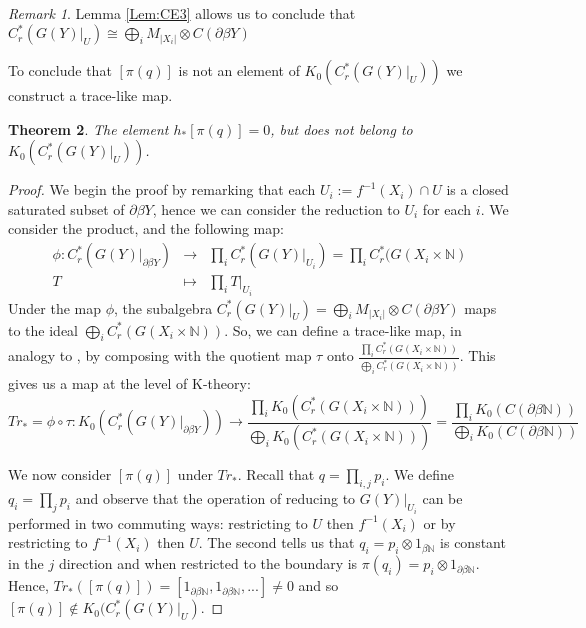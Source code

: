 \documentclass[11pt]{amsart}
\theoremstyle{plain}
\newtheorem{theorem}{Theorem}%
\theoremstyle{definition}%
\theoremstyle{remark}%
\newtheorem{remark}[theorem]{Remark}%
\begin{document}
\begin{remark}
Lemma \ref{Lem:CE3} allows us to conclude that $C^{*}_{r}(G(Y)|_{U}) \cong \bigoplus_{i}M_{\vert X_{i}\vert} \otimes C(\partial\beta Y)$
\end{remark}

To conclude that $[\pi(q)]$ is not an element of $K_{0}(C^{*}_{r}(G(Y)|_{U}))$ we construct a trace-like map.

\begin{theorem}
The element $h_{*}[\pi(q)]=0$, but does not belong to $K_{0}( C^{*}_{r}(G(Y)|_{U}))$.
\end{theorem}
\begin{proof}
We begin the proof by remarking that each $U_{i}:=f^{-1}(X_{i}) \cap U$ is a closed saturated subset of $\partial\beta Y$, hence we can consider the reduction to $U_{i}$ for each $i$. We consider the product, and the following map:
\begin{eqnarray*}
\phi : C^{*}_{r}(G(Y)|_{\partial\beta Y})& \rightarrow & \prod_{i} C^{*}_{r}(G(Y)|_{U_{i}})= \prod_{i}C^{*}_{r}(G(X_{i} \times \mathbb{N})\\
 T  &\mapsto & \prod_{i}T|_{U_{i}}
\end{eqnarray*}
Under the map $\phi$, the subalgebra $C^{*}_{r}(G(Y)|_{U})= \bigoplus_{i}M_{\vert X_{i}\vert} \otimes C(\partial\beta Y)$ maps to the ideal $\bigoplus_{i}C^{*}_{r}(G(X_{i} \times \mathbb{N}))$. So, we can define a trace-like map, in analogy to \cite[Section 6]{explg1}, by composing with the quotient map $\tau$ onto $\frac{\prod_{i}C^{*}_{r}(G(X_{i} \times \mathbb{N}))}{\bigoplus_{i}C^{*}_{r}(G(X_{i} \times \mathbb{N}))}$. This gives us a map at the level of K-theory:
\begin{equation*}
Tr_{*}=\phi \circ \tau : K_{0}(C^{*}_{r}(G(Y)|_{\partial\beta Y})) \rightarrow \frac{\prod_{i}K_{0}(C^{*}_{r}(G(X_{i} \times \mathbb{N})))}{\bigoplus_{i}K_{0}(C^{*}_{r}(G(X_{i} \times \mathbb{N})))}= \frac{\prod_{i}K_{0}(C(\partial\beta \mathbb{N}))}{\bigoplus_{i}K_{0}(C(\partial\beta \mathbb{N}))}
\end{equation*}

We now consider $[\pi(q)]$ under $Tr_{*}$. Recall that $q=\prod_{i,j}p_{i}$. We define $q_{i}=\prod_{j}p_{i}$ and observe that the operation of reducing to $G(Y)|_{U_{i}}$ can be performed in two commuting ways: restricting to $U$ then $f^{-1}(X_{i})$ or by restricting to $f^{-1}(X_{i})$ then $U$. The second tells us that $q_{i}=p_{i} \otimes 1_{\beta\mathbb{N}}$ is constant in the $j$ direction and when restricted to the boundary is $\pi(q_{i})=p_{i}\otimes 1_{\partial\beta \mathbb{N}}$. Hence, $Tr_{*}([\pi(q)])=[1_{\partial\beta \mathbb{N}},1_{\partial\beta\mathbb{N}},...] \not = 0$ and so $[\pi(q)] \not \in K_{0}(C^{*}_{r}(G(Y)|_{U})$.
\end{proof}
\end{document}
